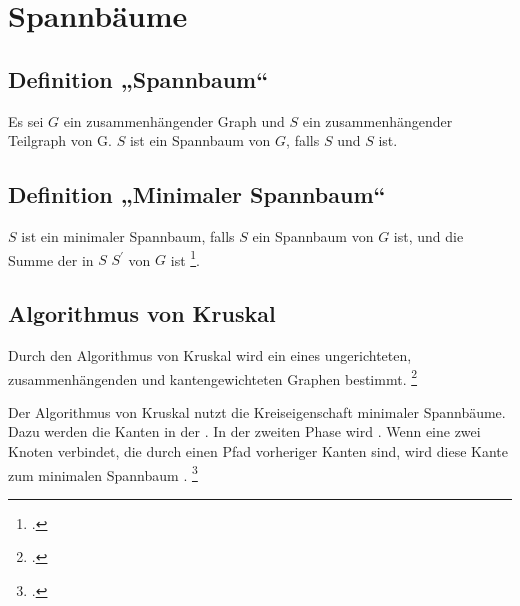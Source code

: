 \documentclass{lehramt-informatik-haupt}
\begin{document}

\chapter{Spannbäume}

%

\section{Definition „Spannbaum“}

Es sei $G$ ein zusammenhängender Graph und $S$ ein zusammenhängender
Teilgraph von G. $S$ ist ein Spannbaum von $G$, falls $S$  und $S$  ist.

%

\section{Definition „Minimaler Spannbaum“}

$S$ ist ein minimaler Spannbaum, falls $S$ ein Spannbaum von $G$ ist,
und die Summe der  in $S$  $S^\prime$ von $G$ ist
\footcite[Seite 29 (PDF 23)]{aud:fs:6}.

%

\section{Algorithmus von Kruskal}

Durch den Algorithmus von Kruskal wird ein 
eines ungerichteten, zusammenhängenden und kantengewichteten Graphen
bestimmt.
\footcite[Seite 30 (PDF 24)]{aud:fs:6}

Der Algorithmus von Kruskal nutzt die Kreiseigenschaft minimaler
Spannbäume. Dazu werden die Kanten in der 
. In der zweiten Phase
wird . Wenn eine
 zwei Knoten verbindet, die  durch einen
Pfad vorheriger Kanten  sind, wird diese Kante zum
minimalen Spannbaum .
\footcite{wiki:kruskal}
\end{document}
